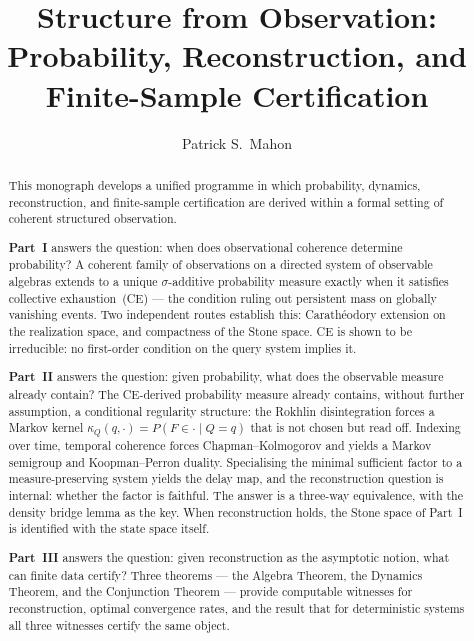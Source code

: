 \documentclass[11pt]{article}
\title{Structure from Observation:\\[6pt]
\large Probability, Reconstruction, and Finite-Sample Certification}
\author{Patrick S.\ Mahon}
\date{}
\theoremstyle{definition}
\begin{document}
\maketitle

\begin{abstract}
This monograph develops a unified programme in which probability, dynamics,
reconstruction, and finite-sample certification are derived within a formal
setting of coherent structured observation.

\medskip
\noindent\textbf{Part~I} answers the question: when does observational coherence
determine probability? A coherent family of observations on a directed system of
observable algebras extends to a unique $\sigma$-additive probability measure
exactly when it satisfies collective exhaustion~(CE) — the condition ruling out
persistent mass on globally vanishing events. Two independent routes establish
this: Carathéodory extension on the realization space, and compactness of the
Stone space. CE is shown to be irreducible: no first-order condition on the
query system implies it.

\medskip
\noindent\textbf{Part~II} answers the question: given probability, what does
the observable measure already contain? The CE-derived probability measure
already contains, without further assumption, a conditional regularity
structure: the Rokhlin disintegration forces a Markov kernel
$\kappa_Q(q,\cdot) = P(F \in \cdot \mid Q = q)$ that is not chosen but read
off. Indexing over time, temporal coherence forces Chapman--Kolmogorov and
yields a Markov semigroup and Koopman--Perron duality. Specialising the
minimal sufficient factor to a measure-preserving system yields the delay
map, and the reconstruction question is internal: whether the factor is
faithful. The answer is a three-way equivalence, with the density bridge
lemma as the key. When reconstruction holds, the Stone space of Part~I is
identified with the state space itself.

\medskip
\noindent\textbf{Part~III} answers the question: given reconstruction as the
asymptotic notion, what can finite data certify? Three theorems — the Algebra
Theorem, the Dynamics Theorem, and the Conjunction Theorem — provide computable
witnesses for reconstruction, optimal convergence rates, and the result that for
deterministic systems all three witnesses certify the same object.
\end{abstract}

\tableofcontents

\newpage
\end{document}
